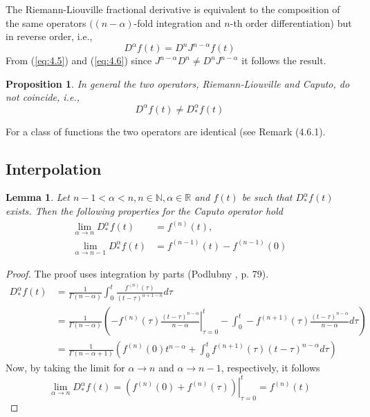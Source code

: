 \documentclass[a4paper,14pt,oneside]{book}
\theoremstyle{plain}
\newtheorem{lem}[thm]{Lemma}
\newtheorem{prop}[thm]{Proposition}
\theoremstyle{definition}
\theoremstyle{remark}
\begin{document}
\begin{center}
\begin{flushleft}
{The Riemann-Liouville fractional derivative is equivalent to the composition of the same operators $((n-\alpha)$-fold integration and $n$-th order differentiation) but in reverse order, i.e.,
\begin{equation}\label{eq:4.6}
D^{\alpha} f(t)=D^{n} J^{n-\alpha} f(t)
\end{equation}
From (\ref{eq:4.5}) and (\ref{eq:4.6}) since $J^{n-\alpha} D^{n} \neq D^{n} J^{n-\alpha}$ it follows the result.
\begin{prop}
In general the two operators, Riemann-Liouville and Caputo, do not coincide, i.e.,
$$
D^{\alpha} f(t) \neq D_{*}^{\alpha} f(t)
$$
\end{prop}
For a class of functions the two operators are identical (see Remark (4.6.1).

\subsection{Interpolation}
\begin{lem}
Let $n-1<\alpha<n,  n \in \mathbb{N},  \alpha \in \mathbb{R}$ and $f(t)$ be such that $D_{*}^{\alpha} f(t)$ exists. Then the following properties for the Caputo operator hold
\begin{align}\label{eq:4.7}
\lim_{\alpha \rightarrow n} D_{*}^{\alpha} f(t) &=f^{(n)}(t),\nonumber\\
\lim_{\alpha \rightarrow n-1} D_{*}^{\alpha} f(t) &=f^{(n-1)}(t)-f^{(n-1)}(0) %
\end{align}
\end{lem} 
\begin{proof}
The proof uses integration by parts (Podlubny \cite{bb22}, p. 79).
$$
\begin{aligned}
D_{*}^{\alpha} f(t) &=\frac{1}{\Gamma(n-\alpha)} \int_{0}^{t} \frac{f^{(n)}(\tau)}{(t-\tau)^{\alpha+1-n}} d \tau \\
&=\frac{1}{\Gamma(n-\alpha)}\left(-\left.f^{(n)}(\tau) \frac{(t-\tau)^{n-\alpha}}{n-\alpha}\right|_{\tau=0}^{t}-\int_{0}^{t}-f^{(n+1)}(\tau) \frac{(t-\tau)^{n-\alpha}}{n-\alpha} d \tau\right) \\
&=\frac{1}{\Gamma(n-\alpha+1)}\left(f^{(n)}(0) t^{n-\alpha}+\int_{0}^{t} f^{(n+1)}(\tau)(t-\tau)^{n-\alpha} d \tau\right)
\end{aligned}
$$
Now, by taking the limit for $\alpha \rightarrow n$ and $\alpha \rightarrow n-1$, respectively, it follows
$$
\lim_{\alpha \rightarrow n} D_{*}^{\alpha} f(t)=\left.\left(f^{(n)}(0)+f^{(n)}(\tau)\right)\right|_{\tau=0}^{t}=f^{(n)}(t)
$$
\end{proof}}
\end{flushleft}
\end{center}
\end{document}

